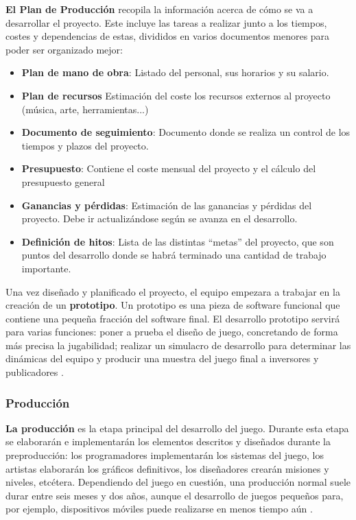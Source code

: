 \textbf{El Plan de Producción} recopila la información acerca de cómo se va a desarrollar el proyecto. Este incluye las tareas a realizar junto a los tiempos, costes y dependencias de estas, divididos en varios documentos menores para poder ser organizado mejor:
\begin{itemize}
\item \textbf{Plan de mano de obra}: Listado del personal, sus horarios y su salario.
\item \textbf{Plan de recursos} Estimación del coste los recursos externos al proyecto (música, arte, herramientas...)
\item \textbf{Documento de seguimiento}: Documento donde se realiza un control de los tiempos y plazos del proyecto.
\item \textbf{Presupuesto}: Contiene el coste mensual del proyecto y el cálculo del presupuesto general
\item \textbf{Ganancias y pérdidas}: Estimación  de las ganancias y  pérdidas del proyecto. Debe ir actualizándose según se avanza en el desarrollo.
\item \textbf{Definición de hitos}: Lista de las distintas ``metas'' del proyecto, que son puntos del desarrollo donde se habrá terminado una cantidad de trabajo importante.
\end{itemize}

Una vez diseñado y planificado el proyecto, el equipo empezara a trabajar en la creación de un \textbf{prototipo}. Un prototipo es una pieza de software funcional que contiene una pequeña fracción del software final. El desarrollo prototipo servirá para varias funciones: poner a prueba el diseño de juego, concretando de forma más precisa la jugabilidad; realizar un simulacro de desarrollo para determinar las dinámicas del equipo y producir una muestra del juego final a inversores y publicadores \cite{game_design_2}. 

\subsubsection{Producción}
\textbf{La producción} es la etapa principal del desarrollo del juego. Durante esta etapa se elaborarán e implementarán los elementos descritos y diseñados durante la preproducción: los programadores implementarán los sistemas del juego, los artistas elaborarán los gráficos definitivos, los diseñadores crearán misiones y niveles, etcétera. Dependiendo del juego en cuestión, una producción normal suele durar entre seis meses y dos años, aunque el desarrollo de juegos pequeños para, por ejemplo, dispositivos móviles puede realizarse en menos tiempo aún \cite{development_and_production}.


